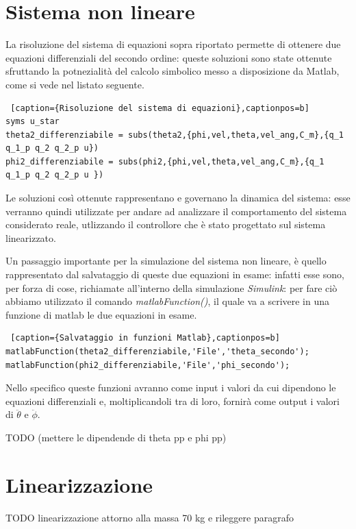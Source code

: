 \section{Sistema non lineare}
La risoluzione del sistema di equazioni sopra riportato permette di ottenere due equazioni differenziali del secondo ordine: queste soluzioni sono state ottenute sfruttando la potnezialità del calcolo simbolico messo a disposizione da Matlab, come si vede nel listato seguente.

\begin{lstlisting} [caption={Risoluzione del sistema di equazioni},captionpos=b]
syms u_star
theta2_differenziabile = subs(theta2,{phi,vel,theta,vel_ang,C_m},{q_1 q_1_p q_2 q_2_p u})
phi2_differenziabile = subs(phi2,{phi,vel,theta,vel_ang,C_m},{q_1 q_1_p q_2 q_2_p u })
\end{lstlisting}

Le soluzioni così ottenute rappresentano e governano la dinamica del sistema: esse verranno quindi utilizzate per andare ad analizzare il comportamento del sistema considerato reale, utlizzando il controllore che è stato progettato sul sistema linearizzato.

Un passaggio importante per la simulazione del sistema non lineare, è quello rappresentato dal salvataggio di queste due equazioni in esame: infatti esse sono, per forza di cose, richiamate all'interno della simulazione \textit{Simulink}: per fare ciò abbiamo utilizzato il comando \textit{matlabFunction()}, il quale va a scrivere in una funzione di matlab le due equazioni in esame.

\begin{lstlisting} [caption={Salvataggio in funzioni Matlab},captionpos=b]
matlabFunction(theta2_differenziabile,'File','theta_secondo');
matlabFunction(phi2_differenziabile,'File','phi_secondo');
\end{lstlisting}

Nello specifico queste funzioni avranno come input i valori da cui dipendono le equazioni differenziali e, moltiplicandoli tra di loro, fornirà come output i valori di $\ddot{\theta}$ e $\ddot{\phi}$.

TODO (mettere le dipendende di theta pp e phi pp)

\section{Linearizzazione}
TODO linearizzazione attorno alla massa 70 kg e rileggere paragrafo

